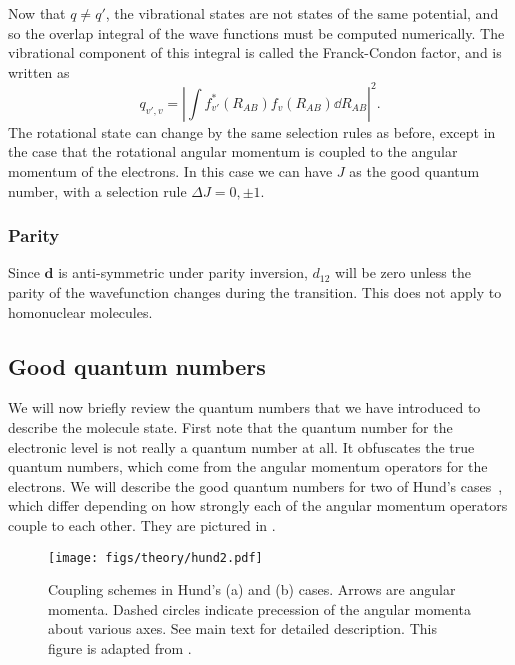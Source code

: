 Now that $q\neq q'$, the vibrational states are not states of the same
potential, and so the overlap integral of the wave functions must
be computed numerically. The vibrational component of this integral is called
the Franck-Condon factor, and is written as
%
\begin{equation}
  q_{v',v} = \left|\int f^*_{v'}(R_{AB})f_v(R_{AB})\dd R_{AB}\right|^2.
\end{equation}
%
The rotational state can change by the same selection rules as before, except
in the case that the rotational angular momentum is coupled to the angular
momentum of the electrons. In this case we can have $J$ as the good quantum
number, with a selection rule $\Delta J = 0, \pm1$.

\subsubsection{Parity}

Since $\mathbf{d}$ is anti-symmetric under parity inversion, $d_{12}$ will be
zero unless the parity of the wavefunction changes during the transition. This
does not apply to homonuclear molecules. 

\subsection{Good quantum numbers}
\label{theory:qnos}

We will now briefly review the quantum numbers that we have introduced to
describe the molecule state. First note that the quantum number for the
electronic level is not really a quantum number at all. It obfuscates the true
quantum numbers, which come from the angular momentum operators for the
electrons. We will describe the good quantum numbers for two of Hund's
cases~\cite{brown_carrington_2003}, which differ depending on how strongly each
of the angular momentum operators couple to each other. They are pictured in
.

\begin{figure}
  \centering
  \texttt{[image: figs/theory/hund2.pdf]}
  \caption[Hund's cases]{
    Coupling schemes in Hund's (a) and (b) cases. Arrows are angular
    momenta. Dashed circles indicate precession of the angular momenta about
    various axes. See main text for detailed description. This figure is
    adapted from .
  }
  \label{theory:fig:hund}
\end{figure}


